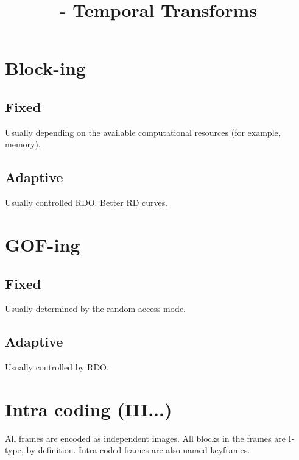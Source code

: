 


\title{\SM{} - Temporal Transforms}

\maketitle
\tableofcontents

\section{Block-ing}

\subsection{Fixed}

Usually depending on the available computational resources (for example, memory).

\subsection{Adaptive}

Usually controlled RDO. Better RD curves.

\section{GOF-ing}

\subsection{Fixed}

Usually determined by the random-access mode.

\subsection{Adaptive}

Usually controlled by RDO.

\section{Intra coding (III...)}

All frames are encoded as independent images.  All blocks in the
frames are I-type, by definition. Intra-coded frames are also named
keyframes.

